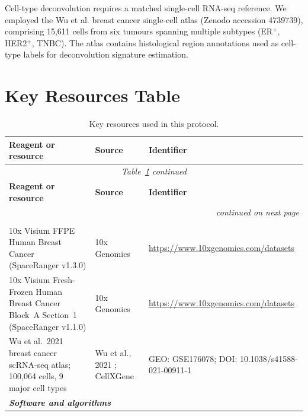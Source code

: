 \documentclass[12pt, a4paper]{article}
\begin{document}
Cell-type deconvolution requires a matched single-cell RNA-seq reference. We employed the Wu et al. \citeyearpar{wu2021} breast cancer single-cell atlas (Zenodo accession 4739739), comprising 15,611 cells from six tumours spanning multiple subtypes (ER$^+$, HER2$^+$, TNBC). The atlas contains histological region annotations used as cell-type labels for deconvolution signature estimation.

\section{Key Resources Table}

\begingroup
\small
\setlength{\LTpre}{4pt}
\setlength{\LTpost}{4pt}
\begin{longtable}{p{4.5cm} p{4.8cm} p{5.3cm}}
\caption{Key resources used in this protocol.}
\label{tab:resources} \\
\toprule
\textbf{Reagent or resource} & \textbf{Source} & \textbf{Identifier} \\
\midrule
\endfirsthead
\multicolumn{3}{c}{\small\itshape Table~\ref{tab:resources} continued} \\
\toprule
\textbf{Reagent or resource} & \textbf{Source} & \textbf{Identifier} \\
\midrule
\endhead
\midrule \multicolumn{3}{r}{\small\itshape continued on next page} \\
\endfoot
\bottomrule
\endlastfoot

\multicolumn{3}{l}{\textit{\textbf{Deposited data}}} \\[2pt]

10x Visium FFPE Human Breast Cancer (SpaceRanger v1.3.0) &
10x Genomics &
\url{https://www.10xgenomics.com/datasets} \\[4pt]

10x Visium Fresh-Frozen Human Breast Cancer Block~A Section~1
(SpaceRanger v1.1.0) &
10x Genomics &
\url{https://www.10xgenomics.com/datasets} \\[4pt]

Wu et al.\ 2021 breast cancer scRNA-seq atlas;
100,064 cells, 9 major cell types &
Wu et al., 2021 \citep{wu2021};
CellXGene &
GEO: GSE176078;
DOI: 10.1038/s41588-021-00911-1 \\[4pt]

\multicolumn{3}{l}{\textit{\textbf{Software and algorithms}}} \\[2pt]


\end{longtable}
\end{document}
